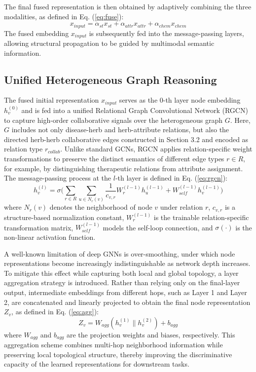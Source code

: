 \documentclass[a4paper,fleqn]{cas-dc}
\begin{document}
The final fused representation is then obtained by adaptively combining the three modalities, as defined in Eq. (\ref{eq:fuse}):
\begin{equation}
\label{eq:fuse}
x_{input} = \alpha_{st} x_{st} + \alpha_{attr} x_{attr} + \alpha_{chem} x_{chem}
\end{equation}
The fused embedding $x_{input}$ is subsequently fed into the message-passing layers, allowing structural propagation to be guided by multimodal semantic information.

\subsection{Unified Heterogeneous Graph Reasoning}

The fused initial representation $x_{input}$ serves as the 0-th layer node embedding $h_v^{(0)}$ and is fed into a unified Relational Graph Convolutional Network (RGCN) to capture high-order collaborative signals over the heterogeneous graph $G$. Here, $G$ includes not only disease-herb and herb-attribute relations, but also the directed herb-herb collaborative edges constructed in Section 3.2 and encoded as relation type $r_{collab}$. Unlike standard GCNs, RGCN applies relation-specific weight transformations to preserve the distinct semantics of different edge types $r \in R$, for example, by distinguishing therapeutic relations from attribute assignment. The message-passing process at the $l$-th layer is defined in Eq. (\ref{eq:rgcn}):
\begin{equation}
\label{eq:rgcn}
h_v^{(l)} = \sigma \Biggl( \sum_{r \in R} \sum_{u \in N_r(v)} \frac{1}{c_{v,r}} W_r^{(l-1)} h_u^{(l-1)} + W_{self}^{(l-1)} h_v^{(l-1)} \Biggr)
\end{equation}
where $N_r(v)$ denotes the neighborhood of node $v$ under relation $r$, $c_{v,r}$ is a structure-based normalization constant, $W_r^{(l-1)}$ is the trainable relation-specific transformation matrix, $W_{self}^{(l-1)}$ models the self-loop connection, and $\sigma(\cdot)$ is the non-linear activation function.

A well-known limitation of deep GNNs is over-smoothing, under which node representations become increasingly indistinguishable as network depth increases. To mitigate this effect while capturing both local and global topology, a layer aggregation strategy is introduced. Rather than relying only on the final-layer output, intermediate embeddings from different hops, such as Layer 1 and Layer 2, are concatenated and linearly projected to obtain the final node representation $Z_v$, as defined in Eq. (\ref{eq:agg}):
\begin{equation}
\label{eq:agg}
Z_v = W_{agg} (h_v^{(1)} \parallel h_v^{(2)}) + b_{agg}
\end{equation}
where $W_{agg}$ and $b_{agg}$ are the projection weights and biases, respectively. This aggregation scheme combines multi-hop neighborhood information while preserving local topological structure, thereby improving the discriminative capacity of the learned representations for downstream tasks.
\end{document}

